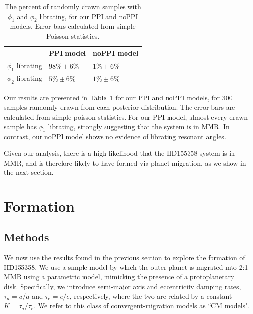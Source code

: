 \begin{table}
\begin{tabular}{p{2cm}p{1.8cm}p{1.8cm}}
\hline \hline
 & PPI model & noPPI model \\\hline
$\phi_1$ librating & $98\% \pm 6\%$ & $1\% \pm 6\%$ \\
$\phi_2$ librating & $5\% \pm 6\%$ & $1\% \pm 6\%$ \\
 \hline \hline
\end{tabular}
\caption{
The percent of randomly drawn samples with $\phi_1$ and $\phi_2$ librating, for our PPI and noPPI models. 
Error bars calculated from simple Poisson statistics. 
}
\label{tab:res}
\end{table}

Our results are presented in Table~\ref{tab:res} for our PPI and noPPI models, for 300 samples randomly drawn from each posterior distribution. 
The error bars are calculated from simple poisson statistics.
For our PPI model, almost every drawn sample has $\phi_1$ librating, strongly suggesting that the system is in MMR. 
In contrast, our noPPI model shows no evidence of librating resonant angles.

Given our analysis, there is a high likelihood that the HD155358 system is in MMR, and is therefore likely to have formed via planet migration, as we show in the next section.

\section{Formation}
\label{sec:form}
\subsection{Methods}
We now use the results found in the previous section to explore the formation of HD155358.
We use a simple model by which the outer planet is migrated into 2:1 MMR using a parametric model, mimicking the presence of a protoplanetary disk.
Specifically, we introduce semi-major axis and eccentricity damping rates, $\tau_a = a/\dot{a}$ and $\tau_e = e/\dot{e}$, respectively, where the two are related by a constant $K = \tau_a / \tau_e$. 
We refer to this class of convergent-migration models as ``CM models". 

